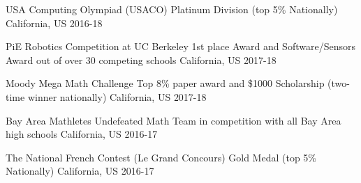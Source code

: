 



\begin{cvhonors}
  
  \cvhonor
    {USA Computing Olympiad (USACO)} %
    {Platinum Division (top 5\% Nationally)}
    {California, US} %
    {2016-18} %
    
  \cvhonor
    {PiE Robotics Competition at UC Berkeley}  %
    {1st place Award and Software/Sensors Award out of over 30 competing schools}
    {California, US} %
    {2017-18} %

  \cvhonor
    {Moody Mega Math Challenge} %
    {Top 8\% paper award and \$1000 Scholarship (two-time winner nationally)}
    {California, US} %
    {2017-18} %
 
  \cvhonor
    {Bay Area Mathletes} %
    {Undefeated Math Team in competition with all Bay Area high schools}
    {California, US} %
    {2016-17} %

  \cvhonor
    {The National French Contest (Le Grand Concours)} %
    {Gold Medal (top 5\% Nationally)}
    {California, US} %
    {2016-17} %
      
\end{cvhonors}

